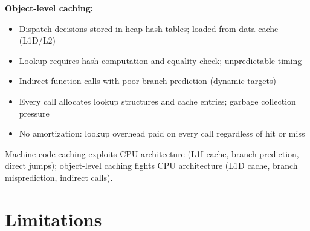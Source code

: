 \documentclass[sigplan,final,acmsmall,review,screen]{acmart}
\begin{document}
\textbf{Object-level caching:}
\begin{itemize}
  \item Dispatch decisions stored in heap hash tables; loaded from data cache (L1D/L2)
  \item Lookup requires hash computation and equality check; unpredictable timing
  \item Indirect function calls with poor branch prediction (dynamic targets)
  \item Every call allocates lookup structures and cache entries; garbage collection pressure
  \item No amortization: lookup overhead paid on every call regardless of hit or miss
\end{itemize}

Machine-code caching exploits CPU architecture (L1I cache, branch prediction, direct jumps);
object-level caching fights CPU architecture (L1D cache, branch misprediction, indirect calls).

\section{Limitations}
\end{document}

